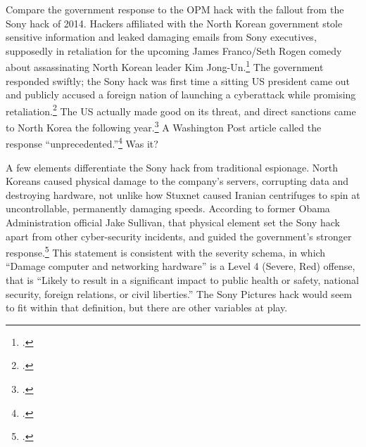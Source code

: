 \documentclass{memoir}
\begin{document}
\begin{refsegment}

Compare the government response to the OPM hack with the fallout from the Sony hack of 2014. Hackers affiliated with the North Korean government stole sensitive information and leaked damaging emails from Sony executives, supposedly in retaliation for the upcoming James Franco/Seth Rogen comedy about assassinating North Korean leader Kim Jong-Un.\footcite{barnes_sony_2017} The government responded swiftly; the Sony hack was first time a sitting US president came out and publicly accused a foreign nation of launching a cyberattack while promising retaliation.\footcite{sanger_u.s._2016} The US actually made good on its threat, and direct sanctions came to North Korea the following year.\footcite{lederman_us_2015} A Washington Post article called the response ``unprecedented.''\footcite{nakashima_why_2015} Was it?

A few elements differentiate the Sony hack from traditional espionage. North Koreans caused physical damage to the company's servers, corrupting data and destroying hardware, not unlike how Stuxnet caused Iranian centrifuges to spin at uncontrollable, permanently damaging speeds. According to former Obama Administration official Jake Sullivan, that physical element set the Sony hack apart from other cyber-security incidents, and guided the government's stronger response.\footcite[Jake Sullivan served as the Deputy Assistant to the President and National Security Advisor to the Vice President. Piror to that, he was the Director of Policy Planning at the State Department.]{sullivan_personal_2019} This statement is consistent with the severity schema, in which ``Damage computer and networking hardware'' is a Level 4 (Severe, Red) offense, that is ``Likely to result in a significant impact to public health or safety, national security, foreign relations, or civil liberties.'' The Sony Pictures hack would seem to fit within that definition, but there are other variables at play.


\end{refsegment}
\end{document}
